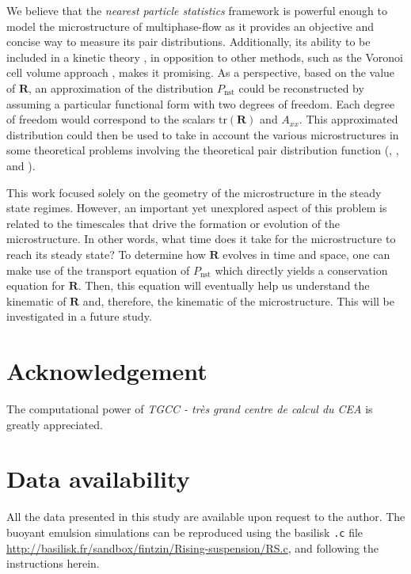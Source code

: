 \documentclass[11pt]{My_preprint}
\begin{document}
We believe that the \textit{nearest particle statistics} framework is powerful enough to model the microstructure of multiphase-flow as it provides an objective and concise way to measure its pair distributions. 
Additionally, its ability to be included in a kinetic theory \citep{zhang2023evolution}, in opposition to other methods,  such as the Voronoi cell volume approach \citep{senthil2005voronoi}, makes it promising. As a perspective, based on the value of $\textbf{R}$, an approximation of the distribution $P_\text{nst}$ could be reconstructed by assuming a particular functional form with two degrees of freedom.
Each degree of freedom would correspond to the scalars $\text{tr}(\textbf{R})$ and $A_{xx}$.
This approximated distribution could then be used to take in account the various microstructures in some theoretical problems involving the theoretical pair distribution function (\citet{batchelor1972sedimentation}, \citet{hinch1977averaged,wang1999longitudinal}, and \citet{zhang2021ensemble}).

This work focused solely on the geometry of the microstructure in the steady state regimes. 
However, an important yet unexplored aspect of this problem is related to the timescales that drive the formation or evolution of the microstructure. 
In other words, what time does it take for the microstructure to reach its steady state? 
To determine how $\textbf{R}$ evolves in time and space, one can make use of the transport equation of $P_\text{nst}$ which directly yields a conservation equation for $\textbf{R}$. 
Then, this equation will eventually help us understand the kinematic of $\textbf{R}$ and, therefore, the kinematic of the microstructure. 
This will be investigated in a future study. 

 

\section*{Acknowledgement}

The computational power of  \textit{TGCC - tr\`es grand centre de calcul du CEA} is greatly appreciated. 
\section*{Data availability}

All the data presented in this study are available upon request to the author. 
The buoyant emulsion simulations can be reproduced using the basilisk \texttt{.c} file \url{http://basilisk.fr/sandbox/fintzin/Rising-suspension/RS.c}, and following the instructions herein. 
\end{document}
